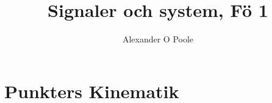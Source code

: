 \documentclass[a4paper,12pt]{article}
\title{Signaler och system, Fö 1}
\author{Alexander O Poole}
\begin{document}
\section{Punkters Kinematik}
\end{document}
